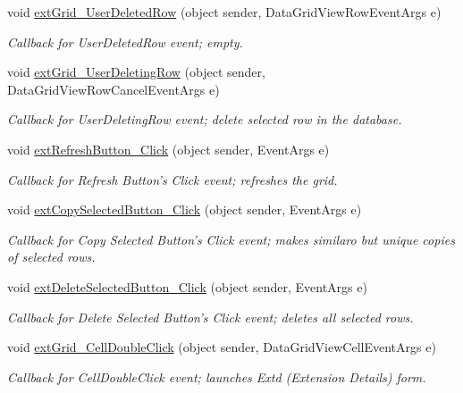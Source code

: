 \begin{DoxyCompactItemize}
void \hyperlink{class_ias_pbx_config_1_1_extensions_a499905d72e84d3c888be21271662d3d8}{extGrid\_\-UserDeletedRow} (object sender, DataGridViewRowEventArgs e)
\begin{DoxyCompactList}\small\item\em Callback for UserDeletedRow event; empty. \item\end{DoxyCompactList}\item 
void \hyperlink{class_ias_pbx_config_1_1_extensions_a4fc7cbae23f7bbfe872a5a88d057a85e}{extGrid\_\-UserDeletingRow} (object sender, DataGridViewRowCancelEventArgs e)
\begin{DoxyCompactList}\small\item\em Callback for UserDeletingRow event; delete selected row in the database. \item\end{DoxyCompactList}\item 
void \hyperlink{class_ias_pbx_config_1_1_extensions_a78b63b607c0f699aa7f647821e6643ed}{extRefreshButton\_\-Click} (object sender, EventArgs e)
\begin{DoxyCompactList}\small\item\em Callback for Refresh Button's Click event; refreshes the grid. \item\end{DoxyCompactList}\item 
void \hyperlink{class_ias_pbx_config_1_1_extensions_a7f5da0e8d8f000a57ad169d728d82724}{extCopySelectedButton\_\-Click} (object sender, EventArgs e)
\begin{DoxyCompactList}\small\item\em Callback for Copy Selected Button's Click event; makes similaro but unique copies of selected rows. \item\end{DoxyCompactList}\item 
void \hyperlink{class_ias_pbx_config_1_1_extensions_a9a030fab8dd11091b79e69a1d7467392}{extDeleteSelectedButton\_\-Click} (object sender, EventArgs e)
\begin{DoxyCompactList}\small\item\em Callback for Delete Selected Button's Click event; deletes all selected rows. \item\end{DoxyCompactList}\item 
void \hyperlink{class_ias_pbx_config_1_1_extensions_a27f31a4ee57aeca9e2f19bba394a90bb}{extGrid\_\-CellDoubleClick} (object sender, DataGridViewCellEventArgs e)
\begin{DoxyCompactList}\small\item\em Callback for CellDoubleClick event; launches Extd (Extension Details) form. \item\end{DoxyCompactList}\end{DoxyCompactItemize}
